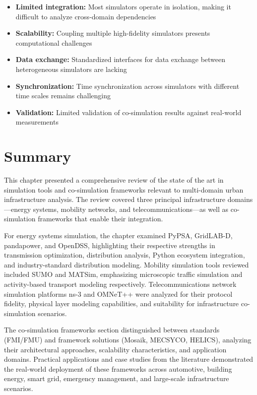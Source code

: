 \begin{itemize}
    \item \textbf{Limited integration:} Most simulators operate in isolation, making it difficult to analyze cross-domain dependencies
    \item \textbf{Scalability:} Coupling multiple high-fidelity simulators presents computational challenges
    \item \textbf{Data exchange:} Standardized interfaces for data exchange between heterogeneous simulators are lacking
    \item \textbf{Synchronization:} Time synchronization across simulators with different time scales remains challenging
    \item \textbf{Validation:} Limited validation of co-simulation results against real-world measurements
\end{itemize}


\section{Summary}

This chapter presented a comprehensive review of the state of the art in simulation tools and co-simulation frameworks relevant to multi-domain urban infrastructure analysis. The review covered three principal infrastructure domains—energy systems, mobility networks, and telecommunications—as well as co-simulation frameworks that enable their integration.

For energy systems simulation, the chapter examined PyPSA, GridLAB-D, pandapower, and OpenDSS, highlighting their respective strengths in transmission optimization, distribution analysis, Python ecosystem integration, and industry-standard distribution modeling. Mobility simulation tools reviewed included SUMO and MATSim, emphasizing microscopic traffic simulation and activity-based transport modeling respectively. Telecommunications network simulation platforms ns-3 and OMNeT++ were analyzed for their protocol fidelity, physical layer modeling capabilities, and suitability for infrastructure co-simulation scenarios.

The co-simulation frameworks section distinguished between standards (FMI/FMU) and framework solutions (Mosaik, MECSYCO, HELICS), analyzing their architectural approaches, scalability characteristics, and application domains. Practical applications and case studies from the literature demonstrated the real-world deployment of these frameworks across automotive, building energy, smart grid, emergency management, and large-scale infrastructure scenarios.

